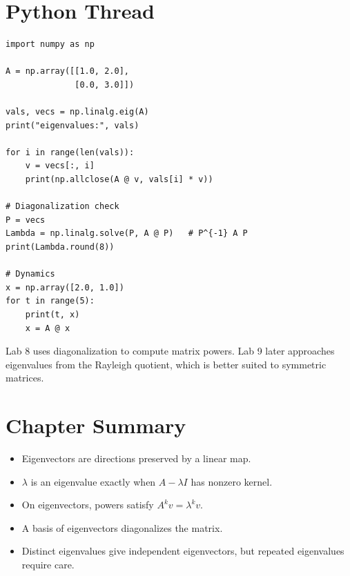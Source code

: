 \section{Python Thread}

\begin{lstlisting}
import numpy as np

A = np.array([[1.0, 2.0],
              [0.0, 3.0]])

vals, vecs = np.linalg.eig(A)
print("eigenvalues:", vals)

for i in range(len(vals)):
    v = vecs[:, i]
    print(np.allclose(A @ v, vals[i] * v))

# Diagonalization check
P = vecs
Lambda = np.linalg.solve(P, A @ P)   # P^{-1} A P
print(Lambda.round(8))

# Dynamics
x = np.array([2.0, 1.0])
for t in range(5):
    print(t, x)
    x = A @ x
\end{lstlisting}

\begin{labbox}
Lab 8 uses diagonalization to compute matrix powers. Lab 9 later approaches
eigenvalues from the Rayleigh quotient, which is better suited to symmetric
matrices.
\end{labbox}

\section*{Chapter Summary}

\begin{itemize}
  \item Eigenvectors are directions preserved by a linear map.
  \item $\lambda$ is an eigenvalue exactly when $A-\lambda I$ has nonzero
        kernel.
  \item On eigenvectors, powers satisfy $A^kv=\lambda^k v$.
  \item A basis of eigenvectors diagonalizes the matrix.
  \item Distinct eigenvalues give independent eigenvectors, but repeated
        eigenvalues require care.
\end{itemize}


